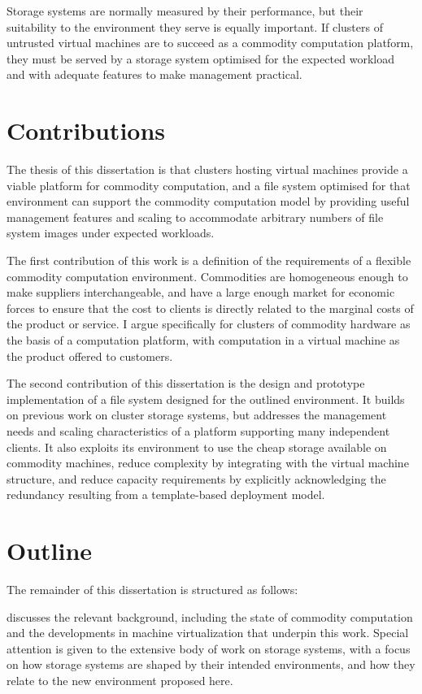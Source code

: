 Storage systems are normally measured by their performance, but their suitability to the environment they serve is equally important. If clusters of untrusted virtual machines are to succeed as a commodity computation platform, they must be served by a storage system optimised for the expected workload and with adequate features to make management practical.

\section{Contributions}

The thesis of this dissertation is that clusters hosting virtual machines provide a viable platform for commodity computation, and a file system optimised for that environment can support the commodity computation model by providing useful management features and scaling to accommodate arbitrary numbers of file system images under expected workloads.

The first contribution of this work is a definition of the requirements of a flexible commodity computation environment. Commodities are homogeneous enough to make suppliers interchangeable, and have a large enough market for economic forces to ensure that the cost to clients is directly related to the marginal costs of the product or service. I argue specifically for clusters of commodity hardware as the basis of a computation platform, with computation in a virtual machine as the product offered to customers.

The second contribution of this dissertation is the design and prototype implementation of a file system designed for the outlined environment. It builds on previous work on cluster storage systems, but addresses the management needs and scaling characteristics of a platform supporting many independent clients. It also exploits its environment to use the cheap storage available on commodity machines, reduce complexity by integrating with the virtual machine structure, and reduce capacity requirements by explicitly acknowledging the redundancy resulting from a template-based deployment model.

\section{Outline}

The remainder of this dissertation is structured as follows:

 discusses the relevant background, including the state of commodity computation and the developments in machine virtualization that underpin this work. Special attention is given to the extensive body of work on storage systems, with a focus on how storage systems are shaped by their intended environments, and how they relate to the new environment proposed here.

